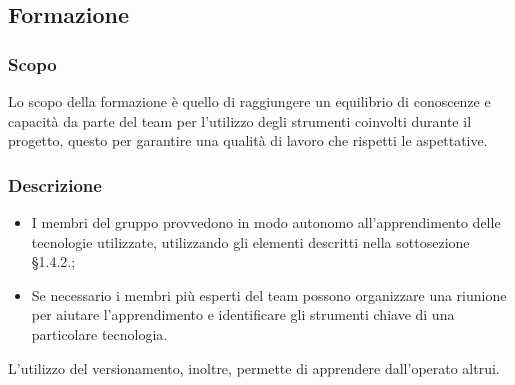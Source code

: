 \subsection{Formazione}

\subsubsection{Scopo}
Lo scopo della formazione è quello di raggiungere un equilibrio di conoscenze e capacità da parte del team per l'utilizzo degli strumenti coinvolti durante il progetto, questo per garantire una qualità di lavoro che rispetti le aspettative.

\subsubsection{Descrizione}
\begin{itemize}
	\item I membri del gruppo provvedono in modo autonomo all'apprendimento delle tecnologie utilizzate, utilizzando gli elementi descritti nella sottosezione §1.4.2.;
	\item Se necessario i membri più esperti del team possono organizzare una riunione per aiutare l'apprendimento e identificare gli strumenti chiave di una particolare tecnologia.
\end{itemize}
L'utilizzo del versionamento, inoltre, permette di apprendere dall'operato altrui.

